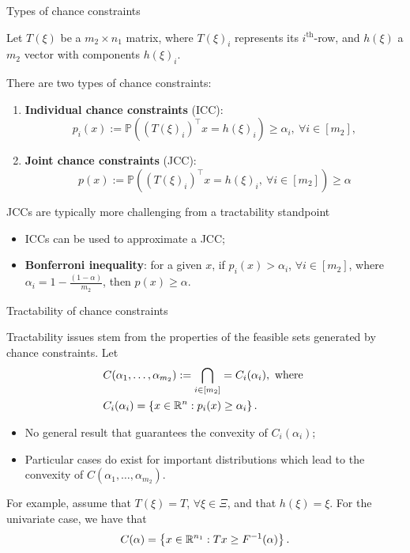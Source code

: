 \begin{frame}{Types of chance constraints}

	Let $T(\xi)$ be a $m_2 \times n_1$ matrix, where $T(\xi)_i$ represents its $i^{\text{th}}$-row, and $h(\xi)$ a $m_2$ vector with components $h(\xi)_i$. 

	There are two types of chance constraints:
	\begin{enumerate}[<+->]
		\item {\bf Individual chance constraints} (ICC):
		\begin{equation*}
			p_i(x) := \mathbb{P}((T(\xi)_i)^\top x = h(\xi)_i) \ge \alpha_i, \ \forall i \in [m_2],
		\end{equation*}
		\item {\bf Joint chance constraints} (JCC):
		\begin{equation*}
			p(x) := \mathbb{P}((T(\xi)_i)^\top x = h(\xi)_i, \ \forall i \in [m_2]) \ge \alpha
		\end{equation*}
	\end{enumerate}
	\vspace{-15pt}
	{\onslide<+->
	JCCs are typically more challenging from a tractability standpoint
	\vspace{-6pt}
	\begin{itemize}
		\item ICCs can be used to \alert{approximate} a JCC;
		\item {\bf Bonferroni inequality}: for a given $x$, if $p_i(x) > \alpha_i$, $\forall i \in [m_2]$, where $\alpha_i = 1 - \frac{(1-\alpha)}{m_2}$, then $p(x) \ge \alpha$.   		
	\end{itemize}
	}
\end{frame}


\begin{frame}{Tractability of chance constraints}
	
	Tractability issues stem from the properties of the \alert{feasible sets} generated by chance constraints. Let
	\begin{align*}
		& C(\alpha_1, \dots, \alpha_{m_2}) := \bigcap_{i \in [m_2]} = C_i(\alpha_i), \text{ where } \\
		& C_i(\alpha_i) = \left\{ x \in \mathbb R^n : p_i(x) \ge \alpha_i \right \}.
	\end{align*}
	\vspace{-18pt}
	\begin{itemize}
		\item No general result that guarantees the \alert{convexity} of $C_i(\alpha_i)$;
		\item \alert{Particular cases} do exist for important distributions which lead to the convexity of $C(\alpha_1, \dots, \alpha_{m_2})$.
	\end{itemize} 
	
	\pause
	For example, assume that $T(\xi) = T$, $\forall \xi \in \Xi$, and that $h(\xi) = \xi$. For the univariate case, we have that
		\begin{equation*}
			C(\alpha) = \left\{ x \in \mathbb R^{n_1} :  Tx \ge F^{-1}(\alpha) \right \}.
		\end{equation*}
\end{frame}



